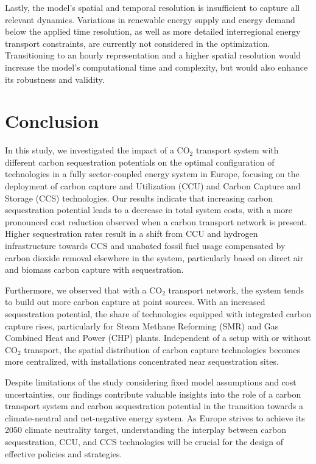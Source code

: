 \documentclass[conference]{IEEEtran}
\newcommand{\carbon}{CO$_2$}
\begin{document}
Lastly, the model's spatial and temporal resolution is insufficient to capture all relevant dynamics. Variations in renewable energy supply and energy demand below the applied time resolution, as well as more detailed interregional energy transport constraints, are currently not considered in the optimization. Transitioning to an hourly representation and a higher spatial resolution would increase the model's computational time and complexity, but would also enhance its robustness and validity.

\section{Conclusion}
\label{sec:conclusion}

In this study, we investigated the impact of a \carbon{} transport system with different carbon sequestration potentials on the optimal configuration of technologies in a fully sector-coupled energy system in Europe, focusing on the deployment of carbon capture and Utilization (CCU) and Carbon Capture and Storage (CCS) technologies. Our results indicate that increasing carbon sequestration potential leads to a decrease in total system costs, with a more pronounced cost reduction observed when a carbon transport network is present. Higher sequestration rates result in a shift from CCU and hydrogen infrastructure towards CCS and unabated fossil fuel usage compensated by carbon dioxide removal elsewhere in the system, particularly based on direct air and biomass carbon capture with sequestration.

Furthermore, we observed that with a \carbon{} transport network, the system tends to build out more carbon capture at point sources. With an increased sequestration potential, the share of technologies equipped with integrated carbon capture rises, particularly for Steam Methane Reforming (SMR) and Gas Combined Heat and Power (CHP) plants. Independent of a setup with or without \carbon{} transport, the spatial distribution of carbon capture technologies becomes more centralized, with installations concentrated near sequestration sites.

Despite limitations of the study considering fixed model assumptions and cost uncertainties, our findings contribute valuable insights into the role of a carbon transport system and carbon sequestration potential in the transition towards a climate-neutral and net-negative energy system. As Europe strives to achieve its 2050 climate neutrality target, understanding the interplay between carbon sequestration, CCU, and CCS technologies will be crucial for the design of effective policies and strategies.
\end{document}
